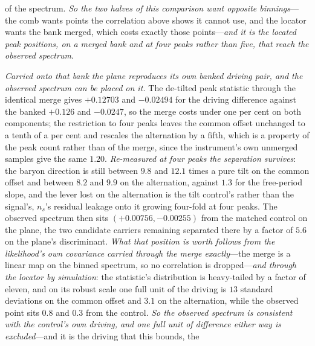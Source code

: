 \documentclass[11pt,a4paper]{article}
\theoremstyle{plain}
\theoremstyle{definition}
\theoremstyle{remark}
\begin{document}
of the spectrum. \emph{So the two halves of this comparison want opposite binnings}---the comb wants
points the correlation above shows it cannot use, and the locator wants the bank merged, which costs
exactly those points---\emph{and it is the located peak positions, on a merged bank and at four peaks
rather than five, that reach the observed
spectrum}.

\emph{Carried onto that bank the plane reproduces its own banked driving pair, and the observed
spectrum can be placed on it.} The de-tilted peak statistic through the identical merge gives
$+0.12703$ and $-0.02494$ for the driving difference against the banked $+0.126$ and $-0.0247$, so
the merge costs under one per cent on both components; the restriction to four peaks leaves the
common offset unchanged to a tenth of a per cent and rescales the alternation by a fifth, which is a
property of the peak count rather than of the merge, since the instrument's own unmerged samples
give the same $1.20$. \emph{Re-measured at four peaks the separation survives}: the baryon direction
is still between $9.8$ and $12.1$ times a pure tilt on the common offset and between $8.2$ and $9.9$
on the alternation, against $1.3$ for the free-period slope, and the lever lost on the alternation is
the tilt control's rather than the signal's, $n_{s}$'s residual leakage onto it growing four-fold at
four peaks. The observed spectrum then sits $(+0.00756,-0.00255)$ from the matched control on the
plane, the two candidate carriers remaining separated there by a factor of $5.6$ on the plane's
discriminant. \emph{What that position is worth follows from the likelihood's own covariance carried
through the merge exactly}---the merge is a linear map on the binned spectrum, so no correlation is
dropped---\emph{and through the locator by simulation}: the statistic's distribution is heavy-tailed
by a factor of eleven, and on its robust scale one full unit of the driving is $13$ standard
deviations on the common offset and $3.1$ on the alternation, while the observed point sits $0.8$ and
$0.3$ from the control. \emph{So the observed spectrum is consistent with the control's own driving,
and one full unit of difference either way is excluded}---and it is the driving that this bounds, the
\end{document}
